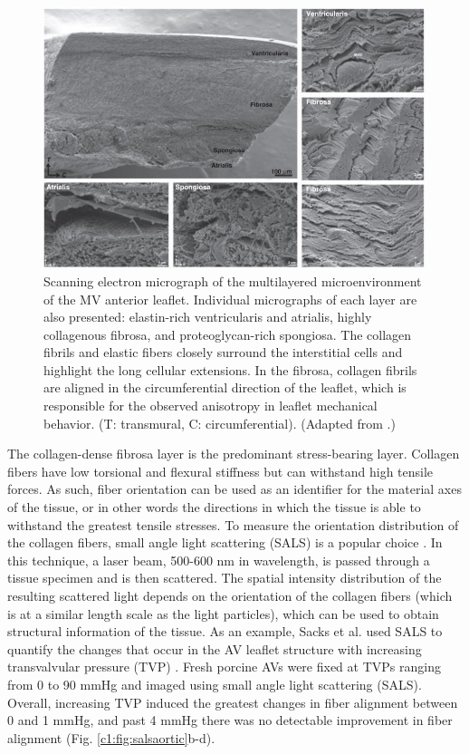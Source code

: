 \begin{figure}
\centering
\includegraphics[width=\textwidth]{Images/chapter1/valvelayers.jpg}
\caption{Scanning electron micrograph of the multilayered microenvironment of the MV anterior leaflet. Individual micrographs of each layer are also presented: elastin-rich ventricularis and atrialis, highly collagenous fibrosa, and proteoglycan-rich spongiosa. The collagen fibrils and elastic fibers closely surround the interstitial cells and highlight the long cellular extensions. In the fibrosa, collagen fibrils are aligned in the circumferential direction of the leaflet, which is responsible for the observed anisotropy in leaflet mechanical behavior. (T: transmural, C: circumferential). (Adapted from \cite{ayoub_heart_2016}.)}
\label{fig:valvelayers}
\end{figure}
   




    The collagen-dense fibrosa layer is the predominant stress-bearing layer. Collagen fibers have low torsional and flexural stiffness but can withstand high tensile forces. As such, fiber orientation can be used as an identifier for the material axes of the tissue, or in other words the directions in which the tissue is able to withstand the greatest tensile stresses. To measure the orientation distribution of the collagen fibers, small angle light scattering (SALS) is a popular choice \cite{sacks_small_1997}. In this technique, a laser beam, 500-600 nm in wavelength, is passed through a tissue specimen and is then scattered. The spatial intensity distribution of the resulting scattered light depends on the orientation of the collagen fibers (which is at a similar length scale as the light particles), which can be used to obtain structural information of the tissue. As an example, Sacks et al. used SALS to quantify the changes that occur in the AV leaflet structure with increasing transvalvular pressure (TVP) \cite{sacks_aortic_1998}.  Fresh porcine AVs were fixed at TVPs ranging from 0 to 90 mmHg and imaged using small angle light scattering (SALS). Overall, increasing TVP induced the greatest changes in fiber alignment between 0 and 1 mmHg, and past 4 mmHg there was no detectable improvement in fiber alignment (Fig. \ref{c1:fig:salsaortic}b-d). 
    
